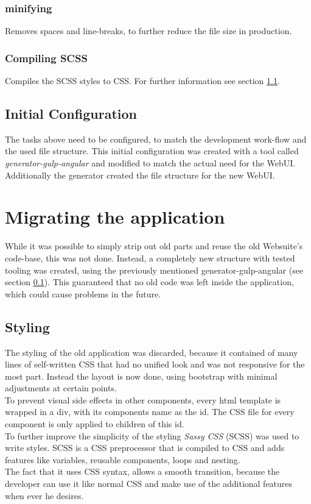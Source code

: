 \subsubsection{minifying} Removes spaces and line-breaks, to further reduce the file size in production.

\subsubsection{Compiling SCSS}
Compiles the SCSS styles to CSS. For further information see section \ref{sec:styling}.


\subsection{Initial Configuration}
\label{sec:initial_config}
The tasks above need to be configured, to match the development work-flow and the used file structure. This initial configuration was created with a tool called \textit{generator-gulp-angular} and modified to match the actual need for the WebUI. Additionally the generator created the file structure for the new WebUI.



\section{Migrating the application}
While it was possible to simply strip out old parts and reuse the old Websuite's code-base, this was not done. Instead, a completely new structure with tested tooling was created, using the previously mentioned generator-gulp-angular (see section \ref{sec:initial_config}). This guaranteed that no old code was left inside the application, which could cause problems in the future.\\


\subsection{Styling}
\label{sec:styling}
The styling of the old application was discarded, because it contained of many lines of self-written CSS that had no unified look and was not responsive for the most part. Instead the layout is now done, using bootstrap with minimal adjustments at certain points.\\
To prevent visual side effects in other components, every html template is wrapped in a div, with its components name as the id. The CSS file for every component is only applied to children of this id.\\
To further improve the simplicity of the styling \textit{Sassy CSS} (SCSS) was used to write styles. SCSS is a CSS preprocessor that is compiled to CSS and adds features like variables, reusable components, loops and nesting.\\
The fact that it uses CSS syntax, allows a smooth transition, because the developer can use it like normal CSS and make use of the additional features when ever he desires.


